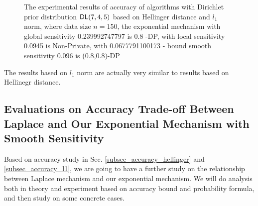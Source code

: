 \begin{figure}
\begin{center}
\centering
\caption{The experimental results of accuracy of algorithms with Dirichlet prior distribution $\mathsf{DL}(7, 4, 5)$ based on Hellinger distance and $l_1$  norm, where data size $n = 150$, the exponential mechanism with global sensitivity 0.239992747797 is 0.8 -DP, with local sensitivity 0.0945 is Non-Private, with 0.0677791100173 - bound smooth sensitivity 0.096 is (0.8,0.8)-DP}
\label{fig_dirichlet_hellinger_l1}
\end{center}
\end{figure}

The results based on $l_1$ norm are actually very similar to results based on Hellinegr distance.


\subsection{Evaluations on Accuracy Trade-off Between Laplace and Our Exponential Mechanism with Smooth Sensitivity}
\label{subsec_accuracy_tradeoff}
Based on accuracy study in Sec. \ref{subsec_accuracy_hellinger} and \ref{subsec_accuracy_l1}, we are going to have a further study on the relationship between Laplace mechanism and our exponential mechanism. We will do analysis both in theory and experiment based on accuracy bound and probability formula, and then study on some concrete cases.

